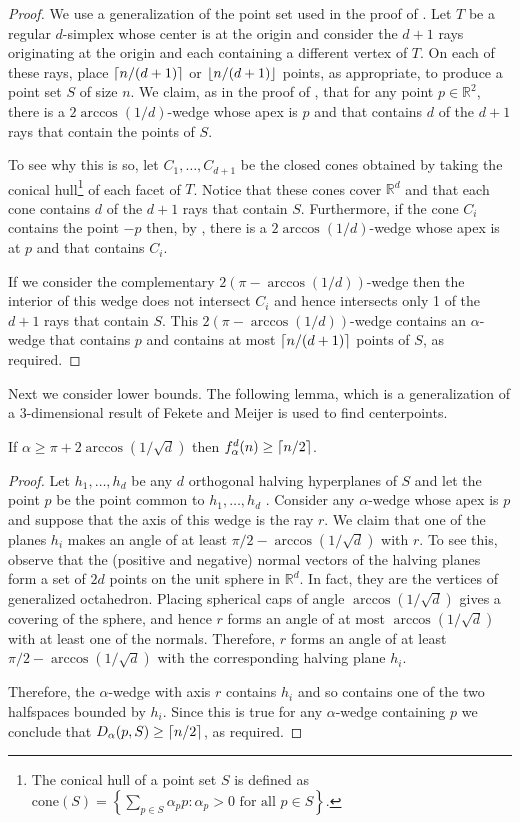 \documentclass{dmtcs}
\newcommand{\R}{\mathbb{R}}
\begin{document}
\begin{proof} 
We use a generalization of the point set used in the proof of
.  Let $T$ be a regular $d$-simplex whose center is at the
origin and consider the $d+1$ rays originating at the origin and each
containing a different vertex of $T$.  On each of these rays, place
$\left\lceil n/(d+1) \right\rceil$ or $\left\lfloor n/(d+1) \right\rfloor$ points, as appropriate, to
produce a point set $S$ of size $n$.  We claim, as in the proof of
, that for any point $p\in\R^2$, there is a
$2\arccos(1/d)$-wedge whose apex is $p$ and that contains $d$ of the
$d+1$ rays that contain the points of $S$. 

To see why this is so, let $C_1,\ldots,C_{d+1}$ be the closed cones
obtained by taking the conical hull\footnote{The conical hull of a
point set $S$ is defined as $\mathrm{cone}(S)=\left\{\sum_{p\in S}\alpha_p p :
\mbox{$\alpha_p > 0$ for all $p\in S$}\right\}$.} of each facet of $T$.
Notice that these cones cover $\R^d$ and that each cone contains $d$
of the $d+1$ rays that contain $S$.  Furthermore, if the cone $C_i$
contains the point $-p$ then, by , there is a
$2\arccos(1/d)$-wedge whose apex is at $p$ and that contains $C_i$.  

If we consider the complementary $2(\pi-\arccos(1/d))$-wedge then the
interior of this wedge does not intersect $C_i$ and hence intersects
only 1 of the $d+1$ rays that contain $S$. This
$2(\pi-\arccos(1/d))$-wedge contains an $\alpha$-wedge that contains $p$
and contains at most $\left\lceil n/(d+1) \right\rceil$ points of $S$, as required.
\end{proof}

Next we consider lower bounds.  The following lemma, which is a
generalization of a 3-dimensional result of Fekete and Meijer
\cite{fm00}
is used to find centerpoints.


\begin{lem}
If $\alpha \ge \pi+2\arccos(1/\sqrt{d})$ then $f_\alpha^d(n)\ge \left\lceil n/2 \right\rceil$.
\end{lem}

\begin{proof}
Let $h_1,\ldots,h_d$ be any $d$ orthogonal halving hyperplanes of $S$
and let the point $p$ be the point common to $h_1,\ldots,h_d$ .
Consider any $\alpha$-wedge whose apex is $p$ and suppose that the
axis of this wedge is the ray $r$.  We claim that one of the planes
$h_i$ makes an angle of at least $\pi/2-\arccos(1/\sqrt{d})$ with $r$.
To see this, observe that the (positive and negative) normal vectors
of the halving planes form a set of $2d$ points on the unit sphere in
$\R^d$.  In fact, they are the vertices of generalized
octahedron. Placing spherical caps of angle $\arccos(1/\sqrt{d})$
gives a covering of the sphere, and hence $r$ forms an angle of at
most $\arccos(1/\sqrt{d})$ with at least one of the normals.
Therefore, $r$ forms an angle of at least $\pi/2-\arccos(1/\sqrt{d})$
with the corresponding halving plane $h_i$.

Therefore, the $\alpha$-wedge with axis $r$ contains $h_i$ and so
contains one of the two halfspaces bounded by $h_i$.  Since this is
true for any $\alpha$-wedge containing $p$ we conclude that
$D_\alpha(p,S)\ge\left\lceil n/2 \right\rceil$, as required.  
\end{proof}
\end{document}

